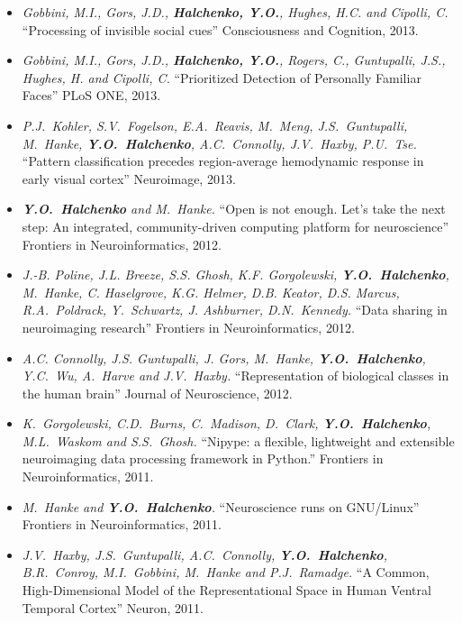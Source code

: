 \documentclass[12pt,overlapped,line]{res}
\newcommand{\mtitle}[1]{``#1''}
\newcommand{\mauthors}[1]{ \textit{#1.}}
\newcommand{\mwhere}[1]{#1.}
\begin{document}
\begin{resume}
 \begin{itemize}

\item
  \mauthors{Gobbini, M.I., Gors, J.D., \textbf{Halchenko, Y.O.}, Hughes, H.C. and Cipolli, C}
  \mtitle{Processing of invisible social cues}
  \mwhere{Consciousness and Cognition, 2013}
\item
  \mauthors{Gobbini, M.I., Gors, J.D., \textbf{Halchenko, Y.O.}, Rogers,
    C., Guntupalli, J.S., Hughes, H. and Cipolli, C}
  \mtitle{Prioritized Detection of Personally Familiar Faces}
  \mwhere{PLoS ONE, 2013}
\item
  \mauthors{P.J.~Kohler, S.V.~Fogelson, E.A.~Reavis, M.~Meng,
    J.S.~Guntupalli, M.~Hanke, \textbf{Y.O.~Halchenko}, A.C.~Connolly,
    J.V.~Haxby, P.U.~Tse}
  \mtitle{Pattern classification precedes
    region-average hemodynamic response in early visual
    cortex}
  \mwhere{Neuroimage, 2013}
 \item
  \mauthors{\textbf{Y.O.~Halchenko} and M.~Hanke}
  \mtitle{Open is not enough. Let’s take the next step: An integrated,
    community-driven computing platform for neuroscience}
  \mwhere{Frontiers in Neuroinformatics, 2012}

 \item
   \mauthors{J.-B. Poline, J.L. Breeze, S.S. Ghosh, K.F. Gorgolewski,
     \textbf{Y.O.~Halchenko}, M.~Hanke, C. Haselgrove, K.G. Helmer,
     D.B. Keator, D.S. Marcus, R.A.~Poldrack, Y.~Schwartz,
     J. Ashburner,  D.N.~Kennedy}
   \mtitle{Data sharing in neuroimaging research}
   \mwhere{Frontiers in Neuroinformatics, 2012}

 \item
   \mauthors{A.C.  Connolly, J.S.  Guntupalli, J. Gors, M.~Hanke,
     \textbf{Y.O.~Halchenko}, Y.C.~Wu, A.~Harve and J.V.~Haxby}
   \mtitle{Representation of biological classes in the human brain}
   \mwhere{Journal of Neuroscience, 2012}

 \item
   \mauthors{K.~Gorgolewski, C.D.~Burns, C.~Madison, D.~Clark, \textbf{Y.O.~Halchenko},
     M.L.~Waskom and S.S.~Ghosh}
   \mtitle{Nipype: a flexible, lightweight and extensible neuroimaging data processing framework in Python.}
   \mwhere{Frontiers in Neuroinformatics, 2011}


 \item
   \mauthors{M.~Hanke and \textbf{Y.O.~Halchenko}}
   \mtitle{Neuroscience runs on {GNU/Linux}}
   \mwhere{Frontiers in Neuroinformatics, 2011}

 \item
   \mauthors{J.V.~Haxby, J.S.~Guntupalli, A.C.~Connolly,
     \textbf{Y.O.~Halchenko}, B.R.~Conroy, M.I.~Gobbini, M.~Hanke and
     P.J.~Ramadge}
   \mtitle{A Common, High-Dimensional Model of the Representational
     Space in Human Ventral Temporal Cortex}
   \mwhere{Neuron, 2011}


\end{itemize}
\end{resume}
\end{document}
